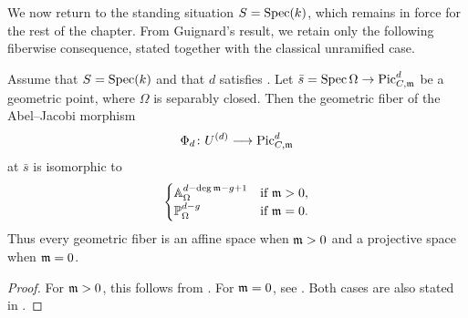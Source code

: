 We now return to the standing situation $S=\Spec(k)$, which remains in
force for the rest of the chapter. From Guignard's result, we retain only
the following fiberwise consequence, stated together with the classical
unramified case.
\begin{theorem}\label{theorem:abel-jacobi-fibers}
Assume that $S=\Spec(k)$ and that $d$ satisfies
. Let
$\bar s=\Spec\Omega\to\PicCm[d]$ be a geometric point, where $\Omega$ is
separably closed. Then the geometric fiber of the Abel--Jacobi morphism
\[
    \Phi_d\colon U^{(d)}\longrightarrow\PicCm[d]
\]
at $\bar s$ is isomorphic to
\[
\begin{cases}
\mathbb{A}_{\Omega}^{d - \deg \mdls - g + 1} & \text{if } \mdls > 0, \\
\mathbb{P}_{\Omega}^{d - g} & \text{if } \mdls = 0.
\end{cases}
\]
Thus every geometric fiber is an affine space when $\mdls>0$ and a
projective space when $\mdls=0$.
\end{theorem}
\begin{proof}
For $\mdls>0$, this follows from
\cite[Proposition~4.14]{Guignard2018}. For $\mdls=0$, see
\cite[Proposition~2.1.4]{Toth2011}.
Both cases are also stated in
\cite[Propositions~3.13--3.14]{tendler2015geometricclassfieldtheory}.
\end{proof}

